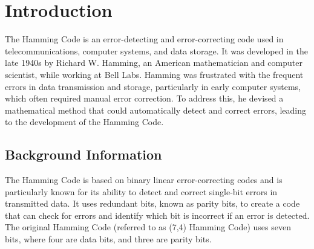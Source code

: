\documentclass{article}
\begin{document}
\maketitle
        \vspace{-2.5cm}
\clearpage
	
	

\tableofcontents
	\thispagestyle{empty}
	\cleardoublepage
	\typeout{}




   
     


\section{Introduction}
The Hamming Code is an error-detecting and error-correcting code used in telecommunications, computer systems, and data storage. It was developed in the late 1940s by Richard W. Hamming, an American mathematician and computer scientist, while working at Bell Labs. Hamming was frustrated with the frequent errors in data transmission and storage, particularly in early computer systems, which often required manual error correction. To address this, he devised a mathematical method that could automatically detect and correct errors, leading to the development of the Hamming Code.
\cite{6772729}



\subsection{Background Information}
The Hamming Code is based on binary linear error-correcting codes and is particularly known for its ability to detect and correct single-bit errors in transmitted data. It uses redundant bits, known as parity bits, to create a code that can check for errors and identify which bit is incorrect if an error is detected. The original Hamming Code (referred to as (7,4) Hamming Code) uses seven bits, where four are data bits, and three are parity bits.
\end{document}
